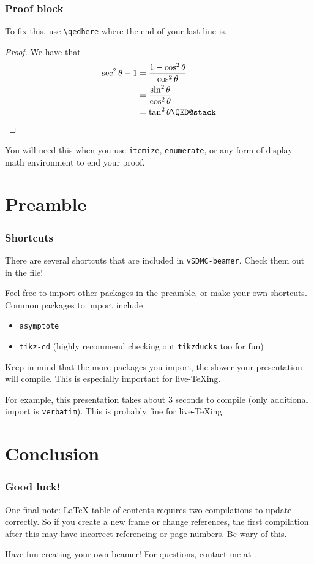 \documentclass[mathserif]{beamer}
\begin{document}
\begin{frame}[fragile]\frametitle{Proof block}
	To fix this, use \verb|\qedhere| where the end of your last line is.
	\begin{proof}
		We have that
		\begin{align*}
			\sec^2\theta-1 &= \frac{1-\cos^2\theta}{\cos^2\theta} \\
			&= \frac{\sin^2\theta}{\cos^2\theta} \\
			&= \tan^2\theta
			\qedhere
		\end{align*}
	\end{proof}
	\pause
	You will need this when you use \texttt{itemize}, \texttt{enumerate}, or any form of display math environment to end your proof.
\end{frame}

\section{Preamble}

\begin{frame}\frametitle{Shortcuts}
	There are several shortcuts that are included in \texttt{vSDMC-beamer}. Check them out in the file!
	\pause
	
	Feel free to import other packages in the preamble, or make your own shortcuts. Common packages to import include
	\begin{itemize}
		\item \texttt{asymptote}
		\item \texttt{tikz-cd} (highly recommend checking out \texttt{tikzducks} too for fun)
	\end{itemize}
	\pause
	Keep in mind that the more packages you import, the slower your presentation will compile. This is especially important for live-TeXing.
	\pause
	
	For example, this presentation takes about 3 seconds to compile (only additional import is \texttt{verbatim}). This is probably fine for live-TeXing.
\end{frame}

\section{Conclusion}

\begin{frame}\frametitle{Good luck!}
	One final note: LaTeX table of contents requires two compilations to update correctly. So if you create a new frame or change references, the first compilation after this may have incorrect referencing or page numbers. Be wary of this.
	\pause
	
	Have fun creating your own beamer! For questions, contact me at .
\end{frame}
\end{document}
